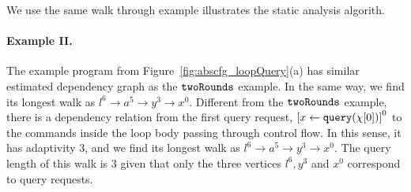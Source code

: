 
We use the same walk through example illustrates the static analysis algorith.

% 
\paragraph{Example II.}
The example program from Figure~\ref{fig:abscfg_loopQuery}(a) has similar estimated dependency graph
as the $\mathtt{twoRounds}$ example.
In the same way, we find its longest walk as $l^6 \to a^5 \to y^3 \to x^0$.
Different from the $\mathtt{twoRounds}$ example, there is a dependency relation from the first query
request, $\clabel{\assign{x}{\query(\chi[0])}}^0 $ to the commands inside the loop body passing through control flow.
In this sense, it has adaptivity $3$, and we find its longest walk as $l^6 \to a^5 \to y^3 \to x^0$.
The query length of this walk is $3$ given that only the three vertices  $l^6, y^3$ and $x^0$
correspond to query requests.
